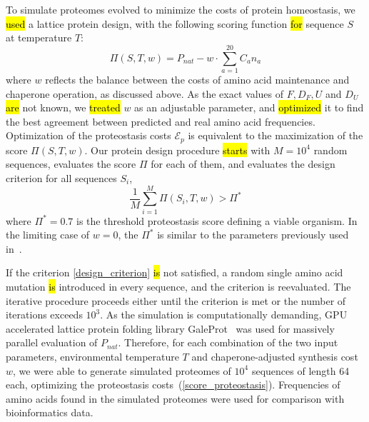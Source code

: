 \documentclass[10pt,letterpaper]{article}
\begin{document}
To simulate proteomes evolved to minimize the costs of protein homeostasis, we \hl{used} a lattice protein design, with the following scoring function \hl{for} sequence $S$ at temperature $T$:
\begin{equation}
	\label{score_proteostasis}
	\Pi(S,T,w) = P_{nat} - w\cdot\sum\limits_{a=1}^{20}C_{a}n_{a}
\end{equation}
where $w$ reflects the balance between the costs of amino acid maintenance and chaperone operation, as discussed above. As the exact values of $F,D_{F},U$ and $D_{U}$ \hl{are} not known, we \hl{treated} $w$ as an adjustable parameter, and \hl{optimized} it to find the best agreement between predicted and real amino acid frequencies. Optimization of the proteostasis costs $\mathcal{E}_{p}$ is equivalent to the maximization of the score $\Pi(S,T,w)$. Our protein design procedure \hl{starts} with $M=10^{4}$ random sequences, evaluates the score $\Pi$ for each of them, and evaluates the design criterion for all sequences $S_i$,
\begin{equation}
	\label{design_criterion}
	\frac{1}{M}\sum\limits_{i=1}^{M}\Pi(S_{i},T,w) > \Pi^*
\end{equation}
where $\Pi^*=0.7$ is the threshold proteostasis score defining a viable organism. In the limiting case of $w=0$, the $\Pi^*$ is similar to the parameters previously used in~\cite{Zeldovich2007First}. 

If the criterion \eqref{design_criterion} \hl{is} not satisfied, a random single amino acid mutation \hl{is} introduced in every sequence, and the criterion is reevaluated. The iterative procedure proceeds either until the criterion is met or the number of iterations exceeds $10^{3}$. As the simulation is computationally demanding, GPU accelerated lattice protein folding library GaleProt~\cite{Venev2015Massively} was used for massively parallel evaluation of $P_{nat}$. Therefore, for each combination of the two input parameters, environmental temperature $T$ and chaperone-adjusted synthesis cost $w$, we were able to generate simulated proteomes of $10^4$ sequences of length 64 each, optimizing the proteostasis costs~(\ref{score_proteostasis}). Frequencies of amino acids found in the simulated proteomes were used for comparison with bioinformatics data.
\end{document}
